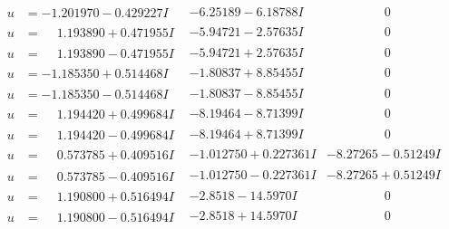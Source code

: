 \documentclass[1p]{elsarticle_modified}
\theoremstyle{definition}
\begin{document}
$$\begin{array}{c|c|c}
\begin{aligned}
u &= -1.201970 - 0.429227 I\end{aligned}
 & -6.25189 - 6.18788 I & \phantom{-0.000000 } 0 \\ \hline\begin{aligned}
u &= \phantom{-}1.193890 + 0.471955 I\end{aligned}
 & -5.94721 - 2.57635 I & \phantom{-0.000000 } 0 \\ \hline\begin{aligned}
u &= \phantom{-}1.193890 - 0.471955 I\end{aligned}
 & -5.94721 + 2.57635 I & \phantom{-0.000000 } 0 \\ \hline\begin{aligned}
u &= -1.185350 + 0.514468 I\end{aligned}
 & -1.80837 + 8.85455 I & \phantom{-0.000000 } 0 \\ \hline\begin{aligned}
u &= -1.185350 - 0.514468 I\end{aligned}
 & -1.80837 - 8.85455 I & \phantom{-0.000000 } 0 \\ \hline\begin{aligned}
u &= \phantom{-}1.194420 + 0.499684 I\end{aligned}
 & -8.19464 - 8.71399 I & \phantom{-0.000000 } 0 \\ \hline\begin{aligned}
u &= \phantom{-}1.194420 - 0.499684 I\end{aligned}
 & -8.19464 + 8.71399 I & \phantom{-0.000000 } 0 \\ \hline\begin{aligned}
u &= \phantom{-}0.573785 + 0.409516 I\end{aligned}
 & -1.012750 + 0.227361 I & -8.27265 - 0.51249 I \\ \hline\begin{aligned}
u &= \phantom{-}0.573785 - 0.409516 I\end{aligned}
 & -1.012750 - 0.227361 I & -8.27265 + 0.51249 I \\ \hline\begin{aligned}
u &= \phantom{-}1.190800 + 0.516494 I\end{aligned}
 & -2.8518 - 14.5970 I & \phantom{-0.000000 } 0 \\ \hline\begin{aligned}
u &= \phantom{-}1.190800 - 0.516494 I\end{aligned}
 & -2.8518 + 14.5970 I & \phantom{-0.000000 } 0 \\ \hline\begin{aligned}

\end{aligned}
\end{array}$$
\end{document}
